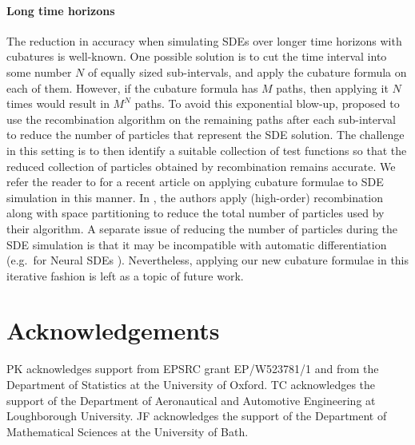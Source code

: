 \documentclass[11pt, letterpaper]{article}
\theoremstyle{definition}
\theoremstyle{remark}
\begin{document}
\paragraph{Long time horizons}
The reduction in accuracy when simulating SDEs over longer time horizons with cubatures is well-known. One possible solution is to cut the time interval into some number $N$ of equally sized sub-intervals, and apply the cubature formula on each of them.
However, if the cubature formula has $M$ paths, then applying it $N$ times would result in $M^N$ paths. To avoid this exponential blow-up, \cite{litterer2012cubature} proposed to use the recombination algorithm on the remaining paths after each sub-interval to reduce the number of particles that represent the SDE solution.
The challenge in this setting is to then identify a suitable collection of test functions so that the reduced collection of particles obtained by recombination remains accurate. We refer the reader to \cite{ninomiya2025cubature} for a recent article on applying cubature formulae to SDE simulation in this manner. In \cite{ninomiya2025cubature}, the authors apply (high-order) recombination along with space partitioning to reduce the total number of particles used by their algorithm.
A separate issue of reducing the number of particles during the SDE simulation is that it may be incompatible with automatic differentiation (e.g.~for Neural SDEs \cite{li2020NSDEs, kidger2021neural, kidger2021efficient}).
Nevertheless, applying our new cubature formulae in this iterative fashion is left as a topic of future work.

\section{Acknowledgements}

PK acknowledges support from EPSRC grant EP/W523781/1 and from the Department of Statistics at the University of Oxford.
TC acknowledges the support of the Department of Aeronautical and Automotive Engineering at Loughborough University.
JF acknowledges the support of the Department of Mathematical Sciences at the University of Bath.
\end{document}
